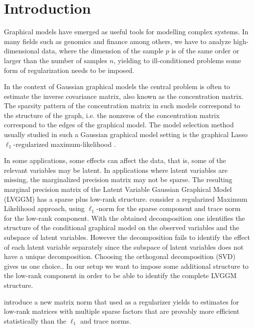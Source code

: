\section{Introduction}
\label{intro}


Graphical models have emerged as useful tools for modelling complex systems. In many fields such as genomics and finance among others, we have to analyze high-dimensional data, where the dimension of the sample $p$ is of the same order or larger than the number of samples $n$, yielding to ill-conditioned problems some form of regularization needs to be imposed.

In the context of Gaussian graphical models the central problem is often to estimate the inverse covariance matrix, also known as the concentration matrix. The sparsity pattern of the concentration matrix in such models correspond to the structure of the graph, i.e. the nonzeros of the concentration matrix correspond to the edges of the graphical model. The model selection method usually studied in such a Gaussian graphical model setting is the graphical Lasso $\ell_1$-regularized maximum-likelihood \citep{friedman2008sparse,yuan2007model,banerjee2008model}.

In some applications, some effects can affect the data, that is, some of the relevant variables may be latent. In applications where latent variables are missing, the marginalized precision matrix may not be sparse. The resulting marginal precision matrix of the Latent Variable Gaussian Graphical Model (LVGGM) has a sparse plus low-rank structure. \citet{chandrasekaran2010} consider a regularized Maximum Likelihood approach, using $\ell_1$-norm for the sparse component and trace norm for the low-rank component. With the obtained decomposition one identifies the structure of the conditional graphical model on the observed variables and the subspace of latent variables. However the decomposition fails to identify the effect of each latent variable separately since the subspace of latent variables does not have a unique decomposition. Choosing the orthogonal decomposition (SVD) gives us one choice.. In our setup we want to impose some additional structure to the low-rank component in order to be able to identify the complete LVGGM structure.  

\citet{richard2014tight} introduce a new matrix norm that used as a regularizer yields to  estimates for low-rank matrices with multiple sparse factors that are provably more efficient statistically than the $\ell_1$ and trace norms.

